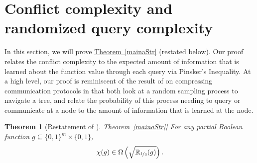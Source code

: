 \documentclass[11pt]{article}
\numberwithin{equation}{section}
\newtheorem{theorem}{Theorem}[section]
\theoremstyle{definition}
\theoremstyle{plain}
\newcommand{\R}{\mathbb R}
\newcommand{\expref}[2]{\hyperref[#2]{#1~\ref{#2}}}
\newcommand{\dr}{\nicefrac}
\begin{document}
\section{Conflict complexity and randomized query complexity}
\label{ccnr}
In this section, we will prove \expref{Theorem}{mainaStr} (restated below).  Our proof relates the conflict complexity to the expected amount of information that is learned about the function value through each query via Pinsker's Inequality.
At a high level, our proof is reminiscent of the result of \cite{DBLP:journals/siamcomp/BarakBCR13} on compressing communication protocols in that both look at a random sampling process to navigate a tree, and relate the probability of 
this process needing to query or communicate at a node to the amount of information that is learned at the node.  
\begin{theorem}[Restatement of \expref{Theorem}{mainaStr}]
\label{mainaStr-restate}
For any partial Boolean function $g \subseteq \{0,1\}^m \times \{0,1\}$,
\[\chi(g)\in\Omega\left(\sqrt{\R_{\dr13}(g)}\right).\]
\end{theorem}
\end{document}
